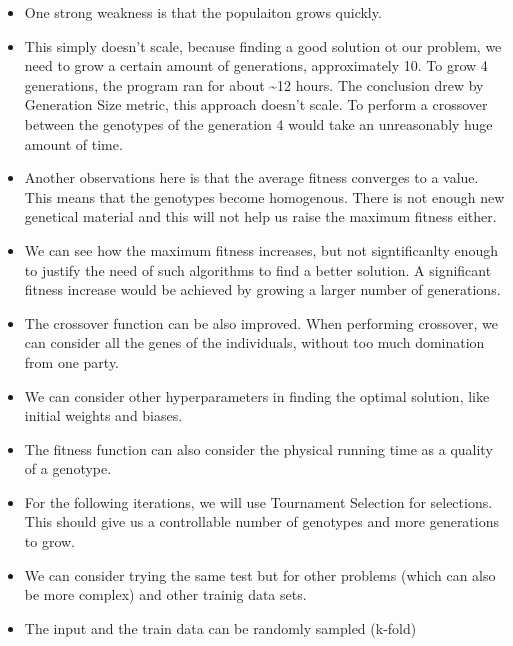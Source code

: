\documentclass[11pt]{article}
\begin{document}
\begin{itemize}
\item
  One strong weakness is that the populaiton grows quickly.
\item
  This simply doesn't scale, because finding a good solution ot our
  problem, we need to grow a certain amount of generations,
  approximately 10. To grow 4 generations, the program ran for about
  \textasciitilde{}12 hours. The conclusion drew by Generation Size
  metric, this approach doesn't scale. To perform a crossover between
  the genotypes of the generation 4 would take an unreasonably huge
  amount of time.
\item
  Another observations here is that the average fitness converges to a
  value. This means that the genotypes become homogenous. There is not
  enough new genetical material and this will not help us raise the
  maximum fitness either.
\item
  We can see how the maximum fitness increases, but not signtificanlty
  enough to justify the need of such algorithms to find a better
  solution. A significant fitness increase would be achieved by growing
  a larger number of generations.
\item
  The crossover function can be also improved. When performing
  crossover, we can consider all the genes of the individuals, without
  too much domination from one party.
\item
  We can consider other hyperparameters in finding the optimal solution,
  like initial weights and biases.
\item
  The fitness function can also consider the physical running time as a
  quality of a genotype.
\item
  For the following iterations, we will use Tournament Selection for
  selections. This should give us a controllable number of genotypes and
  more generations to grow.
\item
  We can consider trying the same test but for other problems (which can
  also be more complex) and other trainig data sets.
\item
  The input and the train data can be randomly sampled (k-fold)
\end{itemize}


    
    
    
    
\end{document}
